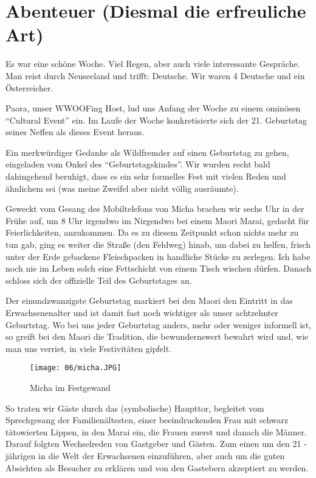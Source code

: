 \chapter{Abenteuer (Diesmal die erfreuliche Art)}

Es war eine schöne Woche. Viel Regen, aber auch viele interessante
Gespräche. Man reist durch Neuseeland und trifft: Deutsche. Wir waren 4
Deutsche und ein Österreicher.

Paora, unser WWOOFing Host, lud uns Anfang der Woche zu einem ominösen
``Cultural Event'' ein. Im Laufe der Woche konkretisierte sich der
21. Geburtstag seines Neffen als dieses Event heraus.

Ein merkwürdiger Gedanke als Wildfremder auf einen Geburtstag zu
gehen, eingeladen vom Onkel des ``Geburtstagskindes''. Wir wurden recht
bald dahingehend beruhigt, dass es ein sehr formelles Fest mit vielen
Reden und ähnlichem sei (was meine Zweifel aber nicht völlig
ausräumte).

Geweckt vom Gesang des Mobiltelefons von Micha brachen wir sechs Uhr
in der Frühe auf, um 8 Uhr irgendwo im Nirgendwo bei einem Maori
Marai, gedacht für Feierlichkeiten, anzukommen. Da es zu diesem
Zeitpunkt schon nichts mehr zu tun gab, ging es weiter die Straße (den
Feldweg) hinab, um dabei zu helfen, frisch unter der Erde gebackene
Fleischpacken in handliche Stücke zu zerlegen. Ich habe noch nie im
Leben solch eine Fettschicht von einem Tisch wischen dürfen. Danach
schloss sich der offizielle Teil des Geburtstages an.

Der einundzwanzigste Geburtstag markiert bei den Maori den Eintritt in
das Erwachsenenalter und ist damit fast noch wichtiger als unser
achtzehnter Geburtstag. Wo bei uns jeder Geburtstag anders, mehr oder
weniger informell ist, so greift bei den Maori die Tradition, die
bewundernswert bewahrt wird und, wie man uns verriet, in viele
Festivitäten gipfelt.

\begin{wrapfigure}[15]{r}{0.3\textwidth}
  \centering
  \texttt{[image: 06/micha.JPG]}
  \caption*{Micha im Festgewand}
\end{wrapfigure}
So traten wir Gäste durch das (symbolische) Haupttor, begleitet vom
Sprechgesang der Familienältesten, einer beeindruckenden Frau mit
schwarz tätowierten Lippen, in den Marai ein, die Frauen zuerst und
danach die Männer. Darauf folgten Wechselreden von Gastgeber und
Gästen. Zum einen um den 21 -jährigen in die Welt der Erwachsenen
einzuführen, aber auch um die guten Absichten als Besucher zu erklären
und von den Gastebern akzeptiert zu werden.


